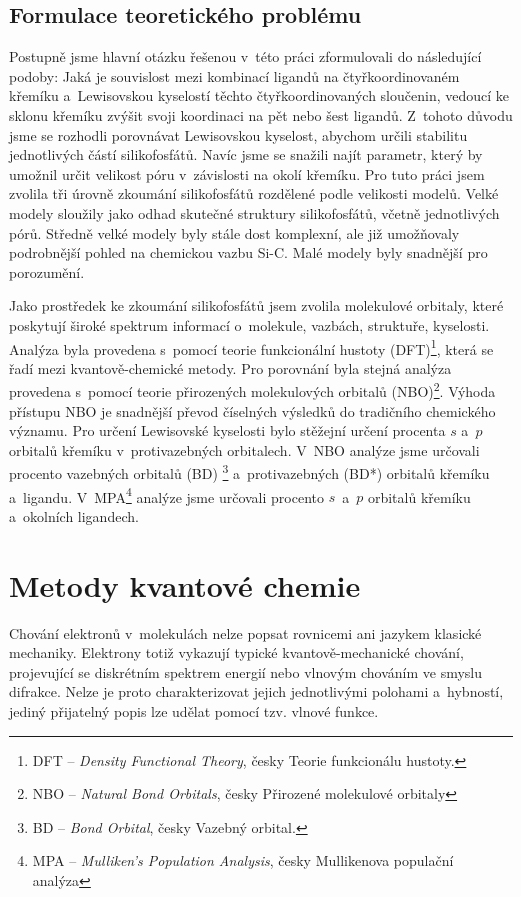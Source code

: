 \documentclass[
digital, %
table,   %
nolof,     %
nolot,     %
oneside,
]{fithesis3}
\begin{document}
\section{Formulace teoretického problému}
Postupně jsme hlavní otázku řešenou v~této práci zformulovali do následující podoby: Jaká je souvislost mezi kombinací ligandů na čtyřkoordinovaném křemíku a~Lewisovskou kyselostí těchto čtyřkoordinovaných sloučenin, vedoucí ke sklonu křemíku zvýšit svoji koordinaci na pět nebo šest ligandů.
Z~tohoto důvodu jsme se rozhodli porovnávat Lewisovskou kyselost, abychom určili stabilitu jednotlivých částí silikofosfátů. Navíc jsme se snažili najít parametr, který by umožnil určit velikost póru v~závislosti na okolí křemíku. Pro tuto práci jsem zvolila tři úrovně zkoumání silikofosfátů rozdělené podle velikosti modelů. Velké modely sloužily jako odhad skutečné struktury silikofosfátů, včetně jednotlivých pórů. Středně velké modely byly stále dost komplexní, ale již umožňovaly podrobnější pohled na chemickou vazbu Si-C. Malé modely byly snadnější pro porozumění.

Jako prostředek ke zkoumání silikofosfátů jsem zvolila molekulové orbitaly, které poskytují široké spektrum informací o~molekule, vazbách, struktuře, kyselosti.  Analýza byla provedena s~pomocí teorie funkcionální hustoty (DFT)\footnote{DFT -- \textit{Density Functional Theory}, česky Teorie funkcionálu hustoty.}, která se řadí mezi kvantově-chemické metody. Pro porovnání byla stejná analýza provedena s~pomocí teorie přirozených molekulových orbitalů (NBO)\footnote{NBO -- \textit{Natural Bond Orbitals}, česky Přirozené molekulové orbitaly}. Výhoda přístupu NBO je snadnější převod číselných výsledků do tradičního chemického významu. Pro určení Lewisovské kyselosti bylo stěžejní určení procenta $s$ a~$p$ orbitalů křemíku v~protivazebných orbitalech.  V~NBO analýze jsme určovali procento vazebných orbitalů (BD) \footnote{BD -- \textit{Bond Orbital}, česky Vazebný orbital.} a~protivazebných (BD*) orbitalů křemíku a~ligandu. V~MPA\footnote{MPA -- \textit{Mulliken's Population Analysis}, česky Mullikenova populační analýza} analýze jsme určovali procento $s$~a~$p$ orbitalů křemíku a~okolních ligandech.
\newpage

\chapter{Metody kvantové chemie}
Chování elektronů v~molekulách nelze popsat rovnicemi ani jazykem klasické mechaniky. Elektrony totiž vykazují typické kvantově-mechanické chování, projevující se diskrétním spektrem energií nebo vlnovým chováním ve smyslu difrakce. Nelze je proto charakterizovat jejich jednotlivými polohami a~hybností, jediný přijatelný popis lze udělat pomocí tzv. vlnové funkce.
\end{document}
